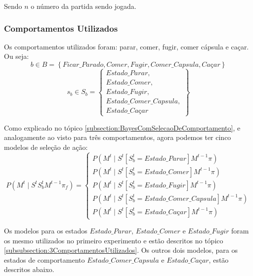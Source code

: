 Sendo $ n $ o número da partida sendo jogada.


\subsubsection{Comportamentos Utilizados} \label{subsubsection:5ComportamentosUtilizados}

Os comportamentos utilizados foram: parar, comer, fugir, comer cápsula e caçar. Ou seja:
$$ b \in B = \left\{ Ficar\_Parado, Comer, Fugir, Comer\_Capsula, \textit{Caçar} \right\} $$
$$ s_b \in S_b = 
        \left\{
            \begin{array}{l}
                Estado\_Parar, \\
                Estado\_Comer, \\
                Estado\_Fugir, \\
                Estado\_Comer\_Capsula, \\
                \textit{Estado\_Caçar}
            \end{array}
        \right\}
         $$

Como explicado no tópico \ref{subsection:BayesComSelecaoDeComportamento}, e analogamente ao visto para três comportamentos, agora podemos ter cinco modelos de seleção de ação:
\begin{equation}
    P \left( M^t \mid S^t S_b^t M^{t-1} \pi_f \right) = 
        \left\{
            \begin{array}{l}
                P \left( M^t \mid S^t \left[ S_b^t=Estado\_Parar \right] M^{t-1} \pi \right) \\
                P \left( M^t \mid S^t \left[ S_b^t=Estado\_Comer \right] M^{t-1} \pi \right) \\
                P \left( M^t \mid S^t \left[ S_b^t=Estado\_Fugir \right] M^{t-1} \pi \right) \\
                P \left( M^t \mid S^t \left[ S_b^t=Estado\_Comer\_Capsula \right] M^{t-1} \pi \right) \\
                P \left( M^t \mid S^t \left[ S_b^t=\textit{Estado\_Caçar} \right] M^{t-1} \pi \right)
            \end{array}
        \right.
\end{equation}

Os modelos para os estados $ Estado\_Parar $, $ Estado\_Comer $ e $ Estado\_Fugir $ foram os mesmo utilizados no primeiro experimento e estão descritos no tópico \ref{subsubsection:3ComportamentosUtilizados}. Os outros dois modelos, para os estados de comportamento $ Estado\_Comer\_Capsula $ e $ \textit{Estado\_Caçar} $, estão descritos abaixo.


